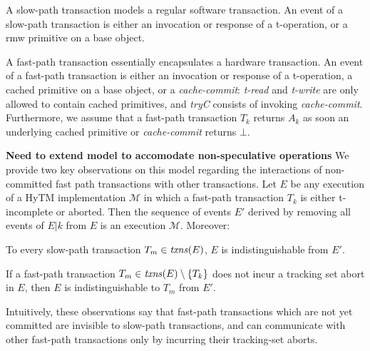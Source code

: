 A slow-path transaction models a regular software transaction.
An event of a slow-path transaction is either an invocation or response of a t-operation, or
a  rmw primitive on a base object. 

A fast-path transaction essentially encapsulates a hardware transaction. 
An event of a fast-path transaction is either an invocation or response of a t-operation, 
a cached primitive on a base object, or a \emph{cache-commit}:
\textit{t-read} and \emph{t-write} are only allowed to contain cached
primitives, and \textit{tryC} consists of invoking \emph{cache-commit}.  
Furthermore, we assume that a fast-path transaction $T_k$ returns $A_k$
as soon an underlying cached primitive or \emph{cache-commit} returns $\bot$. 

\textbf{Need to extend model to accomodate non-speculative operations}
We provide two key observations on this model regarding the interactions of non-committed fast path transactions 
with other transactions. 
Let $E$ be any execution of a HyTM implementation $\mathcal{M}$ in
which a fast-path transaction $T_k$ is either
t-incomplete or aborted. 
Then the sequence of events $E'$ derived by removing all events of $E|k$
from $E$ is an execution  $\mathcal{M}$. Moreover: 
\begin{observation} 
\label{ob:one}
To every slow-path transaction $T_m \in \ms{txns}(E)$, $E$ is indistinguishable 
from $E'$. 
\end{observation}
%
% 	 
%
\begin{observation} 
\label{ob:two}
If a fast-path transaction $T_m\in \ms{txns}(E) \setminus \{T_k\}$ does not incur a tracking set abort in $E$, 
then $E$ is indistinguishable to $T_m$ from $E'$.
\end{observation}
%
Intuitively, these observations say that fast-path transactions which are not yet committed are 
invisible to slow-path transactions, and can communicate with other
fast-path transactions only by incurring their tracking-set aborts.
